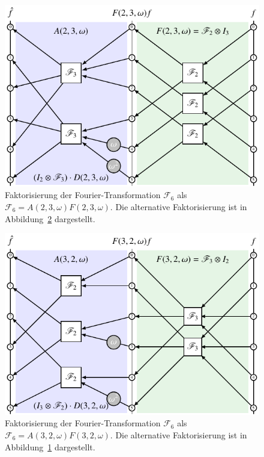 \begin{figure}
\centering
\includegraphics{chapters/060-diskret/images/f32.pdf}
\caption{Faktorisierung der Fourier-Transformation $\mathscr{F}_6$ als
$\mathscr{F}_6=A(2,3,\omega)F(2,3,\omega)$.
Die alternative Faktorisierung ist in
Abbildung~\ref{buch:diskret:faktorisierung:fig:f23}
dargestellt.
\label{buch:diskret:faktorisierung:fig:f32}}
\end{figure}
\begin{figure}
\centering
\includegraphics{chapters/060-diskret/images/f23.pdf}
\caption{Faktorisierung der Fourier-Transformation $\mathscr{F}_6$ als
$\mathscr{F}_6=A(3,2,\omega)F(3,2,\omega)$.
Die alternative Faktorisierung ist in
Abbildung~\ref{buch:diskret:faktorisierung:fig:f32}
dargestellt.
\label{buch:diskret:faktorisierung:fig:f23}}
\end{figure}

